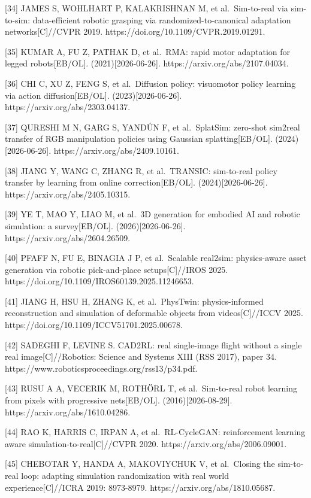 \documentclass[
  chinese,
]{ctexart}
\begin{document}
{[}34{]} JAMES S, WOHLHART P, KALAKRISHNAN M, et al.~Sim-to-real via
sim-to-sim: data-efficient robotic grasping via randomized-to-canonical
adaptation networks{[}C{]}//CVPR 2019.
https://doi.org/10.1109/CVPR.2019.01291.

{[}35{]} KUMAR A, FU Z, PATHAK D, et al.~RMA: rapid motor adaptation for
legged robots{[}EB/OL{]}. (2021){[}2026-06-26{]}.
https://arxiv.org/abs/2107.04034.

{[}36{]} CHI C, XU Z, FENG S, et al.~Diffusion policy: visuomotor policy
learning via action diffusion{[}EB/OL{]}. (2023){[}2026-06-26{]}.
https://arxiv.org/abs/2303.04137.

{[}37{]} QURESHI M N, GARG S, YANDÚN F, et al.~SplatSim: zero-shot
sim2real transfer of RGB manipulation policies using Gaussian
splatting{[}EB/OL{]}. (2024){[}2026-06-26{]}.
https://arxiv.org/abs/2409.10161.

{[}38{]} JIANG Y, WANG C, ZHANG R, et al.~TRANSIC: sim-to-real policy
transfer by learning from online correction{[}EB/OL{]}.
(2024){[}2026-06-26{]}. https://arxiv.org/abs/2405.10315.

{[}39{]} YE T, MAO Y, LIAO M, et al.~3D generation for embodied AI and
robotic simulation: a survey{[}EB/OL{]}. (2026){[}2026-06-26{]}.
https://arxiv.org/abs/2604.26509.

{[}40{]} PFAFF N, FU E, BINAGIA J P, et al.~Scalable real2sim:
physics-aware asset generation via robotic pick-and-place
setups{[}C{]}//IROS 2025.
https://doi.org/10.1109/IROS60139.2025.11246653.

{[}41{]} JIANG H, HSU H, ZHANG K, et al.~PhysTwin: physics-informed
reconstruction and simulation of deformable objects from
videos{[}C{]}//ICCV 2025. https://doi.org/10.1109/ICCV51701.2025.00678.

{[}42{]} SADEGHI F, LEVINE S. CAD2RL: real single-image flight without a
single real image{[}C{]}//Robotics: Science and Systems XIII (RSS 2017),
paper 34. https://www.roboticsproceedings.org/rss13/p34.pdf.

{[}43{]} RUSU A A, VECERIK M, ROTHÖRL T, et al.~Sim-to-real robot
learning from pixels with progressive nets{[}EB/OL{]}.
(2016){[}2026-08-29{]}. https://arxiv.org/abs/1610.04286.

{[}44{]} RAO K, HARRIS C, IRPAN A, et al.~RL-CycleGAN: reinforcement
learning aware simulation-to-real{[}C{]}//CVPR 2020.
https://arxiv.org/abs/2006.09001.

{[}45{]} CHEBOTAR Y, HANDA A, MAKOVIYCHUK V, et al.~Closing the
sim-to-real loop: adapting simulation randomization with real world
experience{[}C{]}//ICRA 2019: 8973-8979.
https://arxiv.org/abs/1810.05687.
\end{document}
